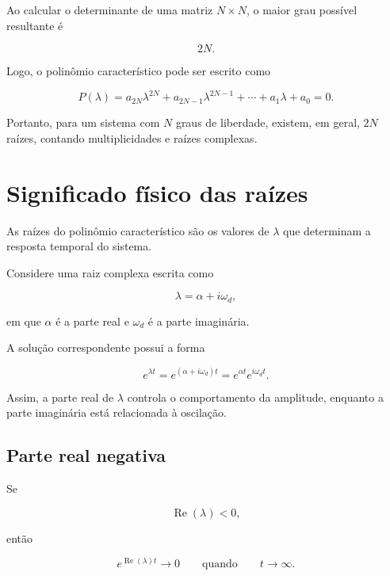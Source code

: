 \documentclass[12pt,a4paper]{article}
\begin{document}
Ao calcular o determinante de uma matriz $N\times N$, o maior grau possível
resultante é

\begin{equation}
2N.
\end{equation}

Logo, o polinômio característico pode ser escrito como

\begin{equation}
\boxed{
P(\lambda)
=
a_{2N}\lambda^{2N}
+a_{2N-1}\lambda^{2N-1}
+\cdots
+a_1\lambda+a_0
=0
}.
\label{eq:polinomio-geral}
\end{equation}

Portanto, para um sistema com $N$ graus de liberdade, existem, em geral,
$2N$ raízes, contando multiplicidades e raízes complexas.

\section{Significado físico das raízes}

As raízes do polinômio característico são os valores de $\lambda$ que
determinam a resposta temporal do sistema.

Considere uma raiz complexa escrita como

\begin{equation}
\lambda=\alpha+i\omega_d,
\end{equation}

em que $\alpha$ é a parte real e $\omega_d$ é a parte imaginária.

A solução correspondente possui a forma

\begin{equation}
e^{\lambda t}
=
e^{(\alpha+i\omega_d)t}
=
e^{\alpha t}e^{i\omega_d t}.
\end{equation}

Assim, a parte real de $\lambda$ controla o comportamento da amplitude,
enquanto a parte imaginária está relacionada à oscilação.

\subsection*{Parte real negativa}

Se

\begin{equation}
\operatorname{Re}(\lambda)<0,
\end{equation}

então

\begin{equation}
e^{\operatorname{Re}(\lambda)t}\rightarrow 0
\qquad\text{quando}\qquad t\rightarrow\infty.
\end{equation}
\end{document}
